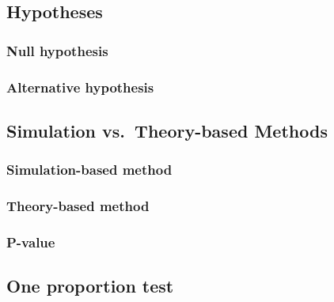 \documentclass[
]{report}
\begin{document}
\hypertarget{hypotheses}{%
\subsection*{Hypotheses}\label{hypotheses}}

\hypertarget{null-hypothesis}{%
\subsubsection*{Null hypothesis}\label{null-hypothesis}}

\hypertarget{alternative-hypothesis}{%
\subsubsection*{Alternative hypothesis}\label{alternative-hypothesis}}

\hypertarget{simulation-vs.-theory-based-methods}{%
\subsection*{Simulation vs.~Theory-based Methods}\label{simulation-vs.-theory-based-methods}}

\hypertarget{simulation-based-method}{%
\subsubsection*{Simulation-based method}\label{simulation-based-method}}

\hypertarget{theory-based-method}{%
\subsubsection*{Theory-based method}\label{theory-based-method}}

\hypertarget{p-value}{%
\subsubsection*{P-value}\label{p-value}}

\hypertarget{one-proportion-test}{%
\subsection*{One proportion test}\label{one-proportion-test}}
\end{document}
